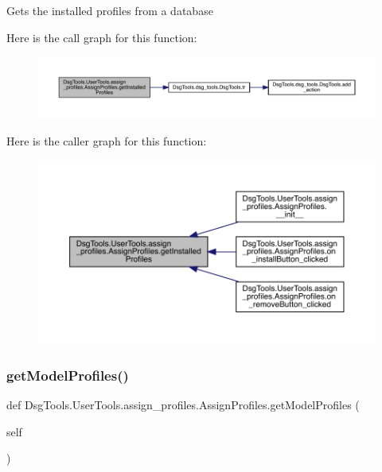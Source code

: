 \begin{DoxyVerb}Gets the installed profiles from a database
\end{DoxyVerb}
 Here is the call graph for this function\+:
\nopagebreak
\begin{figure}[H]
\begin{center}
\leavevmode
\includegraphics[width=350pt]{class_dsg_tools_1_1_user_tools_1_1assign__profiles_1_1_assign_profiles_ac095837e8ec74d5356d387d1f79e2cc1_cgraph}
\end{center}
\end{figure}
Here is the caller graph for this function\+:
\nopagebreak
\begin{figure}[H]
\begin{center}
\leavevmode
\includegraphics[width=350pt]{class_dsg_tools_1_1_user_tools_1_1assign__profiles_1_1_assign_profiles_ac095837e8ec74d5356d387d1f79e2cc1_icgraph}
\end{center}
\end{figure}
\mbox{\label{class_dsg_tools_1_1_user_tools_1_1assign__profiles_1_1_assign_profiles_a88946e6ab8e738c3afed611c7544c96f}} 
\subsubsection{\texorpdfstring{get\+Model\+Profiles()}{getModelProfiles()}}
{\footnotesize\ttfamily def Dsg\+Tools.\+User\+Tools.\+assign\+\_\+profiles.\+Assign\+Profiles.\+get\+Model\+Profiles (\begin{DoxyParamCaption}\item[{}]{self }\end{DoxyParamCaption})}

